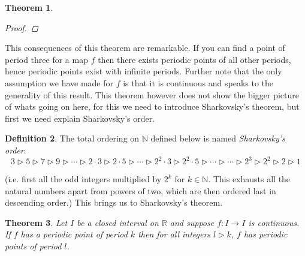 \documentclass[11pt,a4paper,oneside]{memoir}
\theoremstyle{plain}
\newtheorem{thm}{Theorem}[chapter]
\theoremstyle{definition}
\newtheorem{defn}[thm]{Definition}
\begin{document}
\begin{thm}
\begin{proof}
    \end{proof}

    \begin{center}
    \end{center}

\end{thm}

This consequences of this theorem are remarkable. If you can find a point of period three for a map $f$ then there exists periodic points of all other periods, hence periodic points exist with infinite periods. Further note that the only assumption we have made for $f$ is that it is continuous and speaks to the generality of this result. This theorem however does not show the bigger picture of whats going on here, for this we need to introduce Sharkovsky's theorem, but first we need explain Sharkovsky's order.

\begin{defn}
    The total ordering on $\mathbb{N}$ defined below is named \emph{Sharkovsky's order}. \[ 3 \rhd 5 \rhd 7 \rhd 9 \rhd \cdots \rhd 2 \cdot 3 \rhd 2 \cdot 5 \rhd \cdots \rhd 2^2 \cdot 3 \rhd 2^2 \cdot 5 \rhd \cdots \rhd \cdots \rhd 2^3 \rhd 2^2 \rhd 2 \rhd 1 \]
\end{defn}
(i.e. first all the odd integers multiplied by $2^k$ for $k \in \mathbb{N}$. This exhausts all the natural numbers apart from powers of two, which are then ordered last in descending order.) This brings us to Sharkovsky's theorem.

\begin{thm}
    Let $I$ be a closed interval on $\mathbb{R}$ and suppose $f: I \to I$ is continuous. If $f$ has a periodic point of period $k$ then for all integers $l \rhd k$, $f$ has periodic points of period $l$.
\end{thm}
\end{document}
